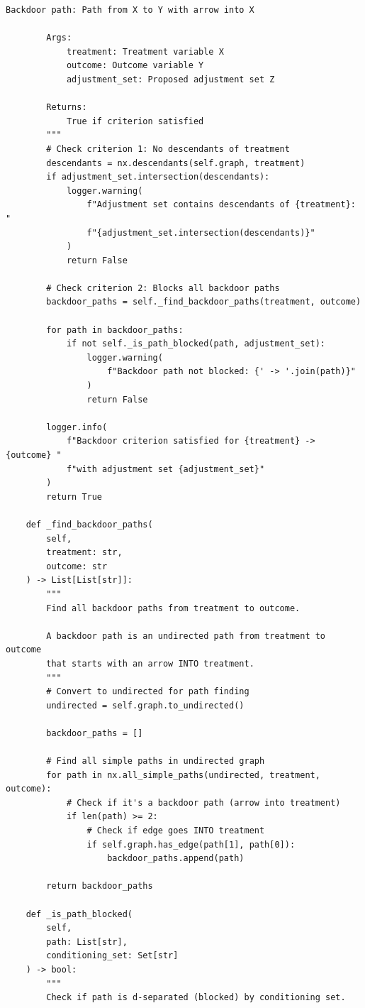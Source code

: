 \begin{lstlisting}[style=python, caption={DAG-based causal inference with backdoor criterion}]
        Backdoor path: Path from X to Y with arrow into X

        Args:
            treatment: Treatment variable X
            outcome: Outcome variable Y
            adjustment_set: Proposed adjustment set Z

        Returns:
            True if criterion satisfied
        """
        # Check criterion 1: No descendants of treatment
        descendants = nx.descendants(self.graph, treatment)
        if adjustment_set.intersection(descendants):
            logger.warning(
                f"Adjustment set contains descendants of {treatment}: "
                f"{adjustment_set.intersection(descendants)}"
            )
            return False

        # Check criterion 2: Blocks all backdoor paths
        backdoor_paths = self._find_backdoor_paths(treatment, outcome)

        for path in backdoor_paths:
            if not self._is_path_blocked(path, adjustment_set):
                logger.warning(
                    f"Backdoor path not blocked: {' -> '.join(path)}"
                )
                return False

        logger.info(
            f"Backdoor criterion satisfied for {treatment} -> {outcome} "
            f"with adjustment set {adjustment_set}"
        )
        return True

    def _find_backdoor_paths(
        self,
        treatment: str,
        outcome: str
    ) -> List[List[str]]:
        """
        Find all backdoor paths from treatment to outcome.

        A backdoor path is an undirected path from treatment to outcome
        that starts with an arrow INTO treatment.
        """
        # Convert to undirected for path finding
        undirected = self.graph.to_undirected()

        backdoor_paths = []

        # Find all simple paths in undirected graph
        for path in nx.all_simple_paths(undirected, treatment, outcome):
            # Check if it's a backdoor path (arrow into treatment)
            if len(path) >= 2:
                # Check if edge goes INTO treatment
                if self.graph.has_edge(path[1], path[0]):
                    backdoor_paths.append(path)

        return backdoor_paths

    def _is_path_blocked(
        self,
        path: List[str],
        conditioning_set: Set[str]
    ) -> bool:
        """
        Check if path is d-separated (blocked) by conditioning set.


\end{lstlisting}
